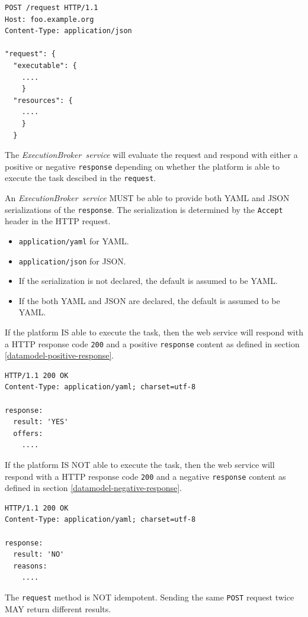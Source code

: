 \documentclass[11pt,a4paper]{ivoa}
\newcommand{\json} {JSON}
\newcommand{\yaml} {YAML}
\newcommand{\webservice} {web service}
\newcommand{\execbrokerservice}[1] {\textit{ExecutionBroker~service#1}}
\newcommand{\codeword}[1] {\texttt{#1}}
\begin{document}
\begin{lstlisting}[]
POST /request HTTP/1.1
Host: foo.example.org
Content-Type: application/json

"request": {
  "executable": {
    ....
    }
  "resources": {
    ....
    }
  }
\end{lstlisting}

The \execbrokerservice{} will evaluate the request and respond with either a positive
or negative \codeword{response} depending on whether the platform is able to execute the
task descibed in the \codeword{request}.

An \execbrokerservice{} MUST be able to provide both \yaml{} and \json{} serializations
of the \codeword{response}.
The serialization is determined by the \codeword{Accept} header in the HTTP request.
\begin{itemize}
    \item \codeword{application/yaml} for \yaml{}.
    \item \codeword{application/json} for \json.
    \item If the serialization is not declared, the default is assumed to be \yaml{}.
    \item If the both \yaml{} and \json{} are declared, the default is assumed to be \yaml{}.
\end{itemize}

If the platform IS able to execute the task, then the \webservice{} will respond with a
HTTP response code \codeword{200} and a positive \codeword{response} content as defined
in section \ref{datamodel-positive-response}.

\begin{lstlisting}[]
HTTP/1.1 200 OK
Content-Type: application/yaml; charset=utf-8

response:
  result: 'YES'
  offers:
    ....
\end{lstlisting}

If the platform IS NOT able to execute the task, then the \webservice{} will respond with a
HTTP response code \codeword{200} and a negative \codeword{response} content as defined
in section \ref{datamodel-negative-response}.

\begin{lstlisting}[]
HTTP/1.1 200 OK
Content-Type: application/yaml; charset=utf-8

response:
  result: 'NO'
  reasons:
    ....
\end{lstlisting}

The \codeword{request} method is NOT idempotent. Sending the same \codeword{POST} request
twice MAY return different results.
\end{document}
